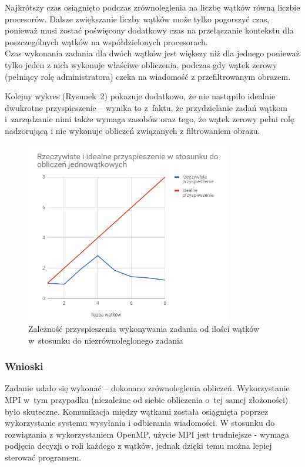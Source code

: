 \documentclass[a4paper,12pt]{article}
\begin{document}
Najkrótszy czas osiągnięto podczas zrównoleglenia na liczbę wątków równą liczbie procesorów. Dalsze zwiększanie liczby wątków może tylko pogorszyć czas, ponieważ musi zostać poświęcony dodatkowy czas na przełączanie kontekstu dla poszczególnych wątków na współdzielonych procesorach.  \\
Czas wykonania zadania dla dwóch wątków jest większy niż dla jednego ponieważ tylko jeden z nich wykonuje właściwe obliczenia, podczas gdy wątek zerowy  (pełniący rolę administratora) czeka na wiadomość z przefiltrowanym obrazem.

Kolejny wykres (Rysunek~2) pokazuje dodatkowo, że nie nastąpiło idealnie dwukrotne przyspieszenie -- wynika to z~faktu, że przydzielanie zadań wątkom i~zarządzanie nimi także wymaga zasobów oraz tego, że wątek zerowy pełni rolę nadzorującą i nie wykonuje obliczeń związanych z filtrowaniem obrazu.

\begin{figure}[!hbtp]
  \centering
  \includegraphics[width=0.8\textwidth]{wykres2.png}
  \caption{Zależność przyspieszenia wykonywania zadania od ilości wątków w~stosunku do niezrównoleglonego zadania}
\end{figure}

\subsubsection*{Wnioski }
Zadanie udało się wykonać -- dokonano zrównoleglenia obliczeń. Wykorzystanie MPI w~tym przypadku (niezależne od siebie obliczenia o~tej samej złożoności) było skuteczne. Komunikacja między wątkami została osiągnięta poprzez wykorzystanie systemu wysyłania i odbierania wiadomości. W stosunku do rozwiązania z wykorzystaniem OpenMP, użycie MPI jest trudniejsze - wymaga podjęcia decyzji o roli każdego z wątków, jednak dzięki temu można lepiej sterować programem.
\end{document}
